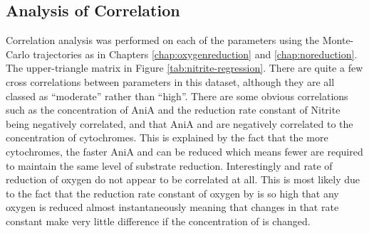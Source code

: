 \subsection{Analysis of Correlation}
Correlation analysis was performed on each of the parameters using the Monte-Carlo trajectories as in Chapters \ref{chap:oxygenreduction} and \ref{chap:noreduction}. The upper-triangle matrix in Figure \ref{tab:nitrite-regression}. There are quite a few cross correlations between parameters in this dataset, although they are all classed as ``moderate'' rather than ``high''. There are some obvious correlations such as the concentration of AniA and the reduction rate constant of Nitrite being negatively correlated, and that AniA and \cbbthree{} are negatively correlated to the concentration of cytochromes. This is explained by the fact that the more cytochromes, the faster AniA and \cbbthree{} can be reduced which means fewer are required to maintain the same level of substrate reduction. Interestingly \cbbthree{} and rate of reduction of oxygen do not appear to be correlated at all. This is most likely due to the fact that the reduction rate constant of oxygen by \cbbthree{} is so high that any oxygen is reduced almost instantaneously meaning that changes in that rate constant make very little difference if the concentration of \cbbthree{} is changed.

